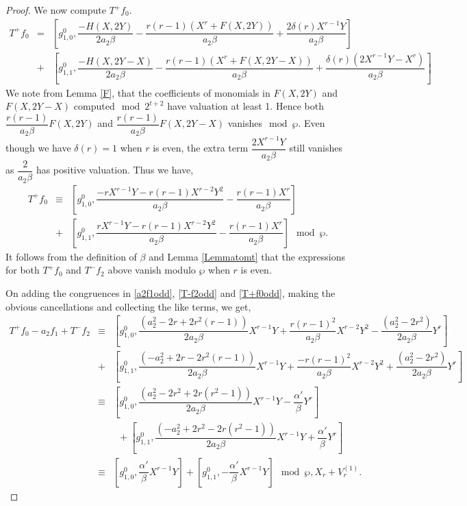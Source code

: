 \documentclass[11pt, reqno]{amsart}
\numberwithin{equation}{section}
\theoremstyle{definition}
\theoremstyle{remark}
\theoremstyle{definition}
\theoremstyle{remark}
\theoremstyle{remark}
\begin{document}
\begin{proof}
   We now compute $T^+f_{0}$.  
\begin{eqnarray*}
   T^+f_0 &=& \left[g_{1,0}^0, \dfrac{-H(X,2Y)}{2a_{2}\beta} - \dfrac{r(r-1)(X^r+F(X,2Y))}{a_2\beta} + \dfrac{2\delta(r)X^{r-1}Y}{a_2\beta}\right]\\
   &+& \left[g_{1,1}^{0}, \dfrac{-H(X,2Y-X)}{2a_{2}\beta} - \dfrac{r(r-1)(X^r+F(X,2Y-X))}{a_2\beta} +\dfrac{\delta(r)(2X^{r-1}Y- X^r)}{a_2\beta}\right]  
\end{eqnarray*}
We note from Lemma \ref{F}, that the coefficients of monomials in $F(X,2Y)$ and $F(X,2Y-X)$ computed$\mod 2^{t+2}$ have valuation at least 1. Hence both $\dfrac{r(r-1)}{a_2\beta}F(X,2Y)$ and $\dfrac{r(r-1)}{a_2\beta}F(X,2Y-X)$ vanishes$\mod \wp$. Even though  we have $\delta(r)=1$ when $r$ is even, the extra term $\dfrac{2X^{r-1}Y}{a_{2}\beta}$ still vanishes as $\dfrac{2}{a_{2}\beta}$ has positive valuation. Thus we have,
\begin{eqnarray} \label{T+f0odd}
  T^+f_0 &\equiv& 
  \left[g_{1,0}^0, \dfrac{-rX^{r-1}Y - r(r-1)X^{r-2}Y^2}{a_{2}\beta} - \dfrac{r(r-1)X^r}{a_{2}\beta} \right] \\
   &+&\left[g_{1,1}^{0}, \dfrac{rX^{r-1}Y-r(r-1)X^{r-2}Y^{2}}{a_2\beta}-\dfrac{r(r-1)X^r}{a_2\beta}  \right]\nonumber \mod \wp. 
\end{eqnarray}
It follows from the definition of $\beta$ and Lemma \ref{Lemmatomt} that the expressions for both $T^+f_0$ and $T^{-}f_{2}$ above vanish modulo $\wp$ when $r$ is even. 

On adding the congruences in \eqref{a2f1odd}, \eqref{T-f2odd} and \eqref{T+f0odd}, making the obvious cancellations and collecting the like terms, we get, %
\begin{eqnarray}\label{rad1}
T^+f_{0}-a_2f_1+T^-f_2 &\equiv&\left[ g_{1,0}^{0}, \dfrac{(a_2^2-2r + 2r^2(r-1))}{2a_2\beta}X^{r-1}Y + \dfrac{r(r-1)^2}{a_2\beta}X^{r-2}Y^2 - \dfrac{(a_2^2-2r^2)}{2a_2\beta}Y^r \right]\nonumber\\
&+ &\left[ g_{1,1}^{0}, \dfrac{(-a_2^2+2r - 2r^2(r-1))}{2a_2\beta}X^{r-1}Y + \dfrac{-r(r-1)^2}{a_2\beta}X^{r-2}Y^2 + \dfrac{(a_2^2-2r^2)}{2a_2\beta}Y^r \right]\nonumber\\
&\equiv&  \left[ g_{1,0}^{0}, \dfrac{(a_2^2-2r^2 + 2r(r^2-1))}{2a_2\beta}X^{r-1}Y - \dfrac{\alpha'}{\beta} Y^r \right]\nonumber\\
&&\enspace + \left[ g_{1,1}^{0}, \dfrac{(-a_2^2+2r^2 - 2r(r^2-1))}{2a_2\beta}X^{r-1}Y + \dfrac{\alpha'}{\beta} Y^r \right]\nonumber\\
&\equiv& \left[ g_{1,0}^{0}, \dfrac{\alpha'}{\beta}X^{r-1}Y  \right]
+ \left[ g_{1,1}^{0}, -\dfrac{\alpha'}{\beta}X^{r-1}Y  \right] \mod \wp,X_{r}+V_{r}^{(1)}.
\end{eqnarray} 


\end{proof}
\end{document}
